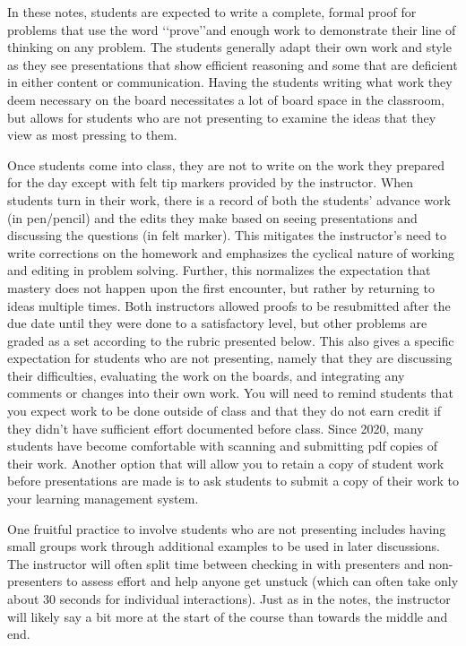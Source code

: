 \begin{annotation}
In these notes, students are expected to write a complete, formal proof for problems that use the word \lq\lq{prove}\rq\rq and enough work to demonstrate their line of thinking on any problem. The students generally adapt their own work and style as they see presentations that show efficient reasoning and some that are deficient in either content or communication. Having the students writing what work they deem necessary on the board necessitates a lot of board space in the classroom, but allows for students who are not presenting to examine the ideas that they view as most pressing to them.

Once students come into class, they are not to write on the work they prepared for the day except with felt tip markers provided by the instructor. When students turn in their work, there is a record of both the students' advance work (in pen/pencil) and the edits they make based on seeing presentations and discussing the questions (in felt marker). This mitigates the instructor’s need to write corrections on the homework and emphasizes the cyclical nature of working and editing in problem solving. Further, this normalizes the expectation that mastery does not happen upon the first encounter, but rather by returning to ideas multiple times. Both instructors allowed proofs to be resubmitted after the due date until they were done to a satisfactory level, but other problems are graded as a set according to the rubric presented below. This also gives a specific expectation for students who are not presenting, namely that they are discussing their difficulties, evaluating the work on the boards, and integrating any comments or changes into their own work. You will need to remind students that you expect work to be done outside of class and that they do not earn credit if they didn't have sufficient effort documented before class. Since 2020, many students have become comfortable with scanning and submitting pdf copies of their work. Another option that will allow you to retain a copy of student work before presentations are made is to ask students to submit a copy of their work to your learning management system.

One fruitful practice to involve students who are not presenting includes having small groups work through additional examples to be used in later discussions. The instructor will often split time between checking in with presenters and non-presenters to assess effort and help anyone get unstuck (which can often take only about 30 seconds for individual interactions). Just as in the notes, the instructor will likely say a bit more at the start of the course than towards the middle and end.


\end{annotation}
